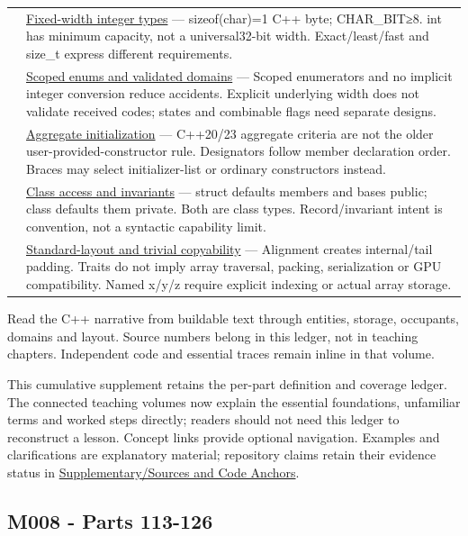 {\begin{longtable}[]{@{}
  >{\raggedright\arraybackslash}p{}
  >{\raggedright\arraybackslash}p{}@{}}
108 & \hyperref[appendix-cc04044b5782]{Fixed-width integer types} --- sizeof(char)=1 C++ byte; CHAR\_BIT≥8. int has minimum capacity, not a universal32-bit width. Exact/least/fast and size\_t express different requirements. \\
109 & \hyperref[appendix-23640fcee147]{Scoped enums and validated domains} --- Scoped enumerators and no implicit integer conversion reduce accidents. Explicit underlying width does not validate received codes; states and combinable flags need separate designs. \\
110 & \hyperref[appendix-b7174c179542]{Aggregate initialization} --- C++20/23 aggregate criteria are not the older user-provided-constructor rule. Designators follow member declaration order. Braces may select initializer-list or ordinary constructors instead. \\
111 & \hyperref[appendix-8e5214819615]{Class access and invariants} --- struct defaults members and bases public; class defaults them private. Both are class types. Record/invariant intent is convention, not a syntactic capability limit. \\
112 & \hyperref[appendix-958870a64c53]{Standard-layout and trivial copyability} --- Alignment creates internal/tail padding. Traits do not imply array traversal, packing, serialization or GPU compatibility. Named x/y/z require explicit indexing or actual array storage. \\
\end{longtable}
}

Read {the C++ narrative} from buildable text through entities, storage, occupants, domains and layout. Source numbers belong in this ledger, not in teaching chapters. Independent code and essential traces remain inline in that volume.

This cumulative supplement retains the per-part definition and coverage ledger. The connected teaching volumes now explain the essential foundations, unfamiliar terms and worked steps directly; readers should not need this ledger to reconstruct a lesson. Concept links provide optional navigation. Examples and clarifications are explanatory material; repository claims retain their evidence status in \hyperref[appendix-a103e7846d21]{Supplementary/Sources and Code Anchors}.

\subsection{M008 - Parts 113-126}\label{appendix-fd090d982a15-m008---parts-113-126}

